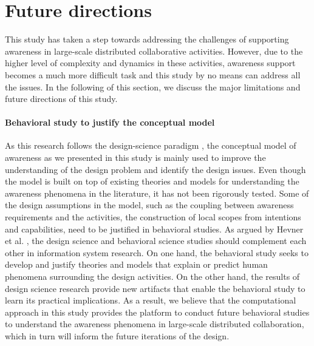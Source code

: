 \section{Future directions} %
\label{sec:future_directions}
This study has taken a step towards addressing the challenges of supporting awareness in large-scale distributed collaborative activities. However, due to the higher level of complexity and dynamics in these activities, awareness support becomes a much more difficult task and this study by no means can address all the issues. In the following of this section, we discuss the major limitations and future directions of this study. 

\paragraph*{Behavioral study to justify the conceptual model} %
\label{par:behavioral_study_to_understand_the_conceptual_model}
As this research follows the design-science paradigm \cite{Hevner2004}, the conceptual model of awareness as we presented in this study is mainly used to improve the understanding of the design problem and identify the design issues. Even though the model is built on top of existing theories and models for understanding the awareness phenomena in the literature, it has not been rigorously tested. Some of the design assumptions in the model, such as the coupling between awareness requirements and the activities, the construction of local scopes from intentions and capabilities, need to be justified in behavioral studies. As argued by Hevner et al. \cite{Hevner2004}, the design science and behavioral science studies should complement each other in information system research. On one hand, the behavioral study seeks to develop and justify theories and models that explain or predict human phenomena surrounding the design activities. On the other hand, the results of design science research provide new artifacts that enable the behavioral study to learn its practical implications. As a result, we believe that the computational approach in this study provides the platform to conduct future behavioral studies to understand the awareness phenomena in large-scale distributed collaboration, which in turn will inform the future iterations of the design. 

